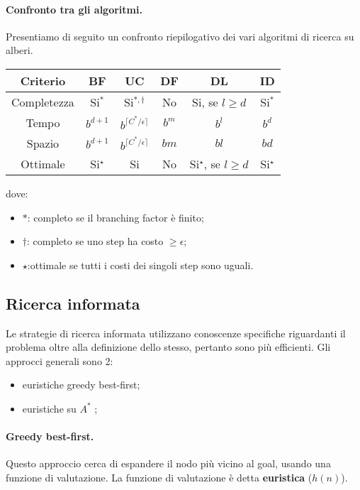 \documentclass[a4paper, 11pt]{article}
\newcommand{\astar}{$A^\ast$ }
\begin{document}
\paragraph{Confronto tra gli algoritmi.} Presentiamo di seguito un confronto riepilogativo dei vari algoritmi di ricerca su alberi. \\
\begin{center}
	\begin{tabular}{c ccccc}
		\toprule
		\textbf{Criterio} & \textbf{BF} & \textbf{UC} & \textbf{DF} & \textbf{DL} & \textbf{ID} \\
		\midrule
		Completezza & Si$^\ast$ & Si$^{\ast, \dagger}$ & No & Si, se $l \geq d$ & Si$^\ast$ \\
		Tempo & $b^{d+1}$ & $b^{\lceil C^\ast / \epsilon \rceil}$ & $b^m$ & $b^l$ & $b^d$ \\
		Spazio & $b^{d+1}$ & $b^{\lceil C^\ast / \epsilon \rceil}$ & $bm$ & $bl$ & $bd$ \\
		Ottimale & Si$^\star$ & Si & No & Si$^\star$, se $l \geq d$ & Si$^\star$ \\
		\bottomrule
	\end{tabular}
\end{center}
dove: \begin{itemize}
	\item $\ast$: completo se il branching factor è finito;
	\item $\dagger$: completo se uno step ha costo $\geq \epsilon$;
	\item $\star$:ottimale se tutti i costi dei singoli step sono uguali.
\end{itemize}

\subsection{Ricerca informata}
Le strategie di ricerca informata utilizzano conoscenze specifiche riguardanti il problema oltre alla definizione dello stesso, pertanto sono più efficienti.
Gli approcci generali sono 2: \begin{itemize}
	\item euristiche greedy best-first;
	\item euristiche su \astar;
\end{itemize}

\paragraph{Greedy best-first.} Questo approccio cerca di espandere il nodo più vicino al goal, usando una funzione di valutazione. La funzione di valutazione è detta \textbf{euristica} ($h(n)$).
\end{document}
